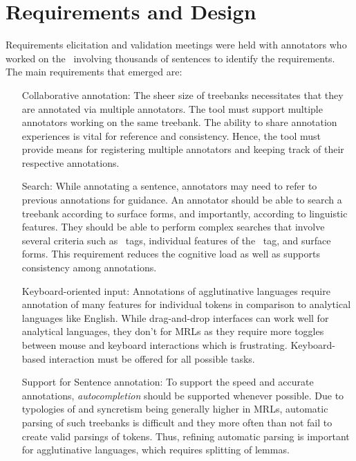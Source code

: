 \section{Requirements and Design}
\label{sec:requirements}


Requirements elicitation and validation meetings were held with annotators who worked on the  \bountreebank\ involving thousands of sentences to identify the requirements.
The main requirements that emerged are:
\begin{itemize}[before=\normalfont, font=\itshape, align=left,noitemsep,topsep=0pt,parsep=3pt,partopsep=0pt,labelsep=3pt,align=left]
    \item[Collaborative annotation:]
        The sheer size of treebanks necessitates that they are annotated via multiple annotators.
        The tool must support multiple annotators working on the same treebank.
        The ability to share annotation experiences is vital for reference and consistency.
        Hence, the tool must provide means for registering multiple annotators and keeping track of their respective annotations.
    \item[Search:]
        While annotating a sentence, annotators may need to refer to previous annotations for guidance.
        An annotator should be able to search a treebank according to surface forms, and importantly, according to linguistic features.
        They should be able to perform complex searches that involve several criteria such as \ud\ tags, individual features of the \feats\ tag, and surface forms.
        This requirement reduces the cognitive load as well as supports consistency among annotations.
    \item[Keyboard-oriented input:]
        Annotations of agglutinative languages require annotation of many features for individual tokens in comparison to analytical languages like English.
        While drag-and-drop interfaces can work well for analytical languages, they don't for MRLs as they require more toggles between mouse and keyboard interactions which is frustrating.
        Keyboard-based interaction must be offered for all possible tasks.
    \item[Support for Sentence annotation:]
        To support the speed and accurate annotations, \textit{autocompletion} should be supported whenever possible.
        Due to typologies of and syncretism being generally higher in MRLs, automatic parsing of such treebanks is difficult and they more often than not fail to create valid parsings of tokens.
        Thus, refining automatic parsing is important for agglutinative languages, which requires splitting of lemmas.

\end{itemize}
